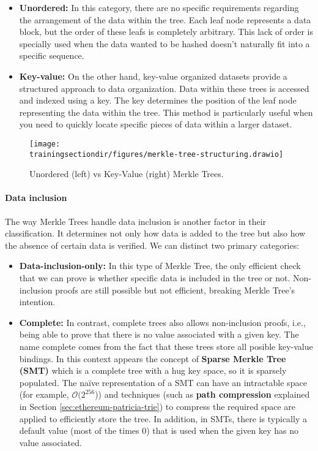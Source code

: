 \begin{itemize}
\item \textbf{Unordered:} In this category, there are no specific requirements regarding the arrangement of the data within the tree. Each leaf node represents a data block, but the order of these leafs is completely arbitrary. This lack of order is specially used when the data wanted to be hashed doesn't naturally fit into a specific sequence.

\item \textbf{Key-value:} On the other hand, key-value organized datasets provide a structured approach to data organization. Data within these trees is accessed and indexed using a key. The key determines the position of the leaf node representing the data within the tree. This method is particularly useful when you need to quickly locate specific pieces of data within a larger dataset.

\end{itemize}

\begin{figure}[H]
\centering
\texttt{[image: \\trainingsectiondir/figures/merkle-tree-structuring.drawio]}
\caption{Unordered (left) vs Key-Value (right) Merkle Trees.}
\label{fig:merkle-tree-key-value}
\end{figure}



\paragraph*{Data inclusion}

The way Merkle Trees handle data inclusion is another factor in their classification. It determines not only how data is added to the tree but also how the absence of certain data is verified. We can distinct two primary categories:

\begin{itemize}
\item \textbf{Data-inclusion-only:} In this type of Merkle Tree, the only efficient check that we can prove is whether specific data is included in the tree or not. Non-inclusion proofs are still possible but not efficient, breaking Merkle Tree's intention.


\item \textbf{Complete:} In contrast, complete trees also allows non-inclusion proofs, i.e., being able to prove that there is no value associated with a given key. The name complete comes from the fact that these trees store all posible key-value bindings. In this context appears the concept of \textbf{Sparse Merkle Tree (SMT)} which is a complete tree with a hug key space, so it is sparsely populated. The naïve representation of a SMT can have an intractable space (for example, $\mathcal{O}(2^{256}$)) and techniques (such as \textbf{path compression} explained in Section \ref{sec:ethereum-patricia-trie}) to compress the required space are applied to efficiently store the tree. In addition, in SMTs, there is typically a default value (most of the times $0$) that is used when the given key has no value associated.

\end{itemize}



